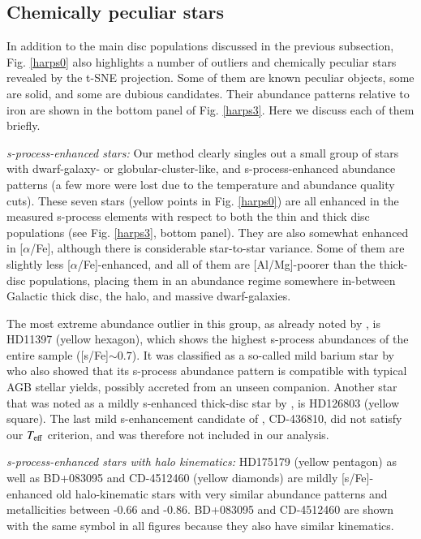 \documentclass{aa}  %
\begin{document}
\subsection{Chemically peculiar stars}\label{peculiar}

In addition to the main disc populations discussed in the previous subsection, Fig. \ref{harps0} also highlights a number of outliers and chemically peculiar stars revealed by the t-SNE projection. Some of them are known peculiar objects, some are solid, and some are dubious candidates. Their abundance patterns relative to iron are shown in the bottom panel of Fig. \ref{harps3}. Here we discuss each of them briefly.

{\it s-process-enhanced stars:} Our method clearly singles out a small group of stars with dwarf-galaxy- or globular-cluster-like, and s-process-enhanced abundance patterns (a few more were lost due to the temperature and abundance quality cuts). These seven stars (yellow points in Fig. \ref{harps0}) are all enhanced in the measured s-process elements with respect to both the thin and thick disc populations (see Fig. \ref{harps3}, bottom panel). They are also somewhat enhanced in [$\alpha$/Fe], although there is considerable star-to-star variance. Some of them are slightly less [$\alpha$/Fe]-enhanced, and all of them are [Al/Mg]-poorer than the thick-disc populations, placing them in an abundance regime somewhere in-between Galactic thick disc, the halo, and massive dwarf-galaxies. 

The most extreme abundance outlier in this group, as already noted by \citet{DelgadoMena2017}, is HD11397 (yellow hexagon), which shows the highest s-process abundances of the entire sample ([s/Fe]$\sim0.7$). It was classified as a so-called mild barium star by \citet{Pompeia2008} who also showed that its s-process abundance pattern is compatible with typical AGB stellar yields, possibly accreted from an unseen companion. 
Another star that was noted as a mildly s-enhanced thick-disc star by \citet{DelgadoMena2017}, is HD126803 (yellow square). The last mild s-enhancement candidate of \citet{DelgadoMena2017}, CD-436810, did not satisfy our $T_{\rm eff}$ criterion, and was therefore not included in our analysis. 

{\it s-process-enhanced stars with halo kinematics:} HD175179 (yellow pentagon) as well as BD+083095 and CD-4512460 (yellow diamonds) are mildly [s/Fe]-enhanced old halo-kinematic stars with very similar abundance patterns and metallicities between -0.66 and -0.86. BD+083095 and CD-4512460 are shown with the same symbol in all figures because they also have similar kinematics. %
\end{document}
